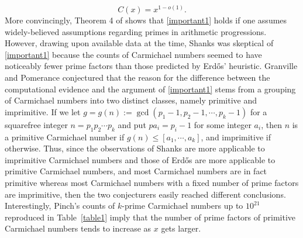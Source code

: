 \documentclass[11pt]{article}
\theoremstyle{plain}
\theoremstyle{definition}
\theoremstyle{remark}
\numberwithin{equation}{subsection}
\begin{document}
\begin{equation} \label{important1}
C(x) = x^{1-o(1)}.
\end{equation}
More convincingly, Theorem 4 of \cite{15} shows that \eqref{important1} holds if one assumes widely-believed assumptions regarding primes in arithmetic progressions. However, drawing upon available data at the time, Shanks \cite{23} was skeptical of \eqref{important1} because the counts of Carmichael numbers seemed to have noticeably fewer prime factors than those predicted by Erd\H{o}s' heuristic. \newline
\indent Granville and Pomerance \cite{8} conjectured that the reason for the difference between the computational evidence and the argument of \eqref{important1} stems from a grouping of Carmichael numbers into two distinct classes, namely primitive and imprimitive. If we let $g = g(n) := \gcd(p_1-1,p_2-1,\cdots,p_k-1)$ for a squarefree integer $n = p_1p_2\cdots p_k$ and put $pa_i = p_i-1$ for some integer $a_i$, then $n$ is a primitive Carmichael number if $g(n) \le [a_1,\cdots,a_k]$, and imprimitive if otherwise. Thus, since the observations of Shanks are more applicable to imprimitive Carmichael numbers and those of Erd\H{o}s are more applicable to primitive Carmichael numbers, and most Carmichael numbers are in fact primitive whereas most Carmichael numbers with a fixed number of prime factors are imprimitive, then the two conjecturers easily reached different conclusions. \newline
\indent Interestingly, Pinch's counts of $k$-prime Carmichael numbers up to $10^{21}$ \cite{16} reproduced in Table~\ref{table1} imply that the number of prime factors of primitive Carmichael numbers tends to increase as $x$ gets larger.
\end{document}
